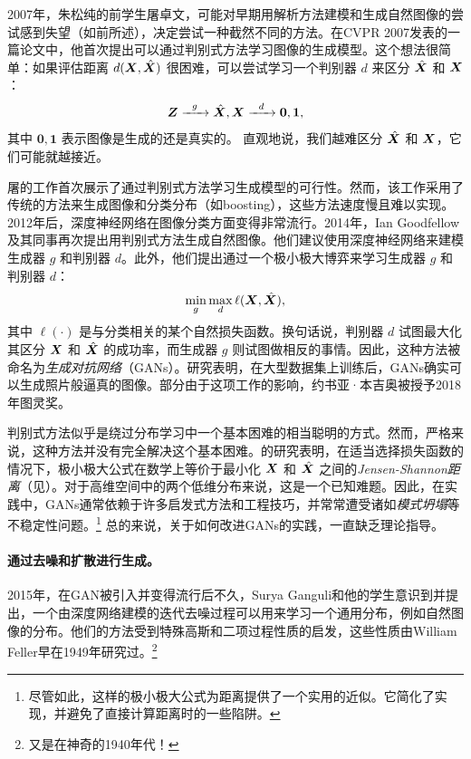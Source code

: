\documentclass[../../book-main.tex]{subfiles}
\begin{document}
2007年，朱松纯的前学生屠卓文，可能对早期用解析方法建模和生成自然图像的尝试感到失望（如前所述），决定尝试一种截然不同的方法。在CVPR 2007发表的一篇论文中\cite{Tu-2007}，他首次提出可以通过判别式方法学习图像的生成模型。这个想法很简单：如果评估距离 $d(\bm{X}, \hat {\bm{X}})$ 很困难，可以尝试学习一个判别器 $d$ 来区分 $\hat {\bm{X}}$ 和 $\bm{X}$：
\begin{equation}
    \bm{Z}   \xrightarrow{\hspace{2mm} g  \hspace{2mm}} \hat {\bm{X}}, \bm{X} \xrightarrow{\hspace{2mm} d  \hspace{2mm}} \boldsymbol{0}, \boldsymbol{1},
       \label{eqn:gan-networks}
\end{equation}
其中 $\boldsymbol{0}, \boldsymbol{1}$ 表示图像是生成的还是真实的。
直观地说，我们越难区分 $\hat {\bm{X}}$ 和 $\bm{X}$，它们可能就越接近。

屠的工作\cite{Tu-2007}首次展示了通过判别式方法学习生成模型的可行性。然而，该工作采用了传统的方法来生成图像和分类分布（如boosting），这些方法速度慢且难以实现。2012年后，深度神经网络在图像分类方面变得非常流行。2014年，Ian Goodfellow及其同事再次提出用判别式方法生成自然图像\cite{Goodfellow-2014}。他们建议使用深度神经网络来建模生成器 $g$ 和判别器 $d$。此外，他们提出通过一个极小极大博弈来学习生成器 $g$ 和判别器 $d$：
\begin{equation}
    \min_g \max_d \ell(\bm{X}, \hat {\bm{X}}),
\end{equation}
其中 $\ell(\cdot)$ 是与分类相关的某个自然损失函数。换句话说，判别器 $d$ 试图最大化其区分 $\bm{X}$ 和 $\hat {\bm{X}}$ 的成功率，而生成器 $g$ 则试图做相反的事情。因此，这种方法被命名为{\em 生成对抗网络}（GANs）。研究表明，在大型数据集上训练后，GANs确实可以生成照片般逼真的图像。部分由于这项工作的影响，约书亚·本吉奥被授予2018年图灵奖。

判别式方法似乎是绕过分布学习中一个基本困难的相当聪明的方式。然而，严格来说，这种方法并没有完全解决这个基本困难。\cite{Goodfellow-2014}的研究表明，在适当选择损失函数的情况下，极小极大公式在数学上等价于最小化 $\bm{X}$ 和 $\hat {\bm{X}}$ 之间的{\em Jensen-Shannon距离}（见\cite{Cover-Thomas}）。对于高维空间中的两个低维分布来说，这是一个已知难题。因此，在实践中，GANs通常依赖于许多启发式方法和工程技巧，并常常遭受诸如{\em 模式坍塌}等不稳定性问题。\footnote{尽管如此，这样的极小极大公式为距离提供了一个实用的近似。它简化了实现，并避免了直接计算距离时的一些陷阱。} 总的来说，关于如何改进GANs的实践，一直缺乏理论指导。

\paragraph{通过去噪和扩散进行生成。}
2015年，在GAN被引入并变得流行后不久，Surya Ganguli和他的学生意识到并提出，一个由深度网络建模的迭代去噪过程可以用来学习一个通用分布，例如自然图像的分布\cite{Sohl-Dickstein2015}。他们的方法受到特殊高斯和二项过程性质的启发，这些性质由William Feller早在1949年研究过\cite{Feller1949OnTT}。\footnote{又是在神奇的1940年代！}
\end{document}

